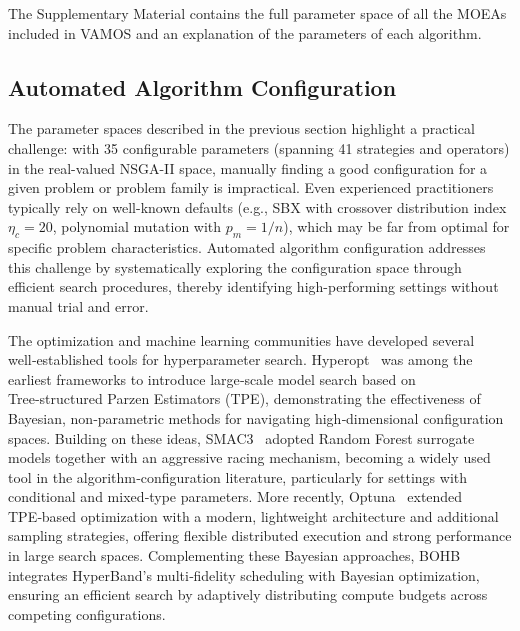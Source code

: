 \documentclass[journal]{IEEEtran}
\newcommand{\VAMOS}{VAMOS}
\begin{document}
The Supplementary Material contains the full parameter space of all the MOEAs included in \VAMOS{} and an explanation of the parameters of each algorithm.

\subsection{Automated Algorithm Configuration}
\label{sec:aac}

The parameter spaces described in the previous section highlight a practical challenge: with 35 configurable parameters (spanning 41 strategies and operators) in the real-valued NSGA-II space, manually finding a good configuration for a given problem or problem family is impractical. Even experienced practitioners typically rely on well-known defaults (e.g., SBX with crossover distribution index $\eta_c = 20$, polynomial mutation with $p_m = 1/n$), which may be far from optimal for specific problem characteristics. Automated algorithm configuration addresses this challenge by systematically exploring the configuration space through efficient search procedures, thereby identifying high-performing settings without manual trial and error.


The optimization and machine learning communities have developed several well‑established tools for hyperparameter search. Hyperopt~\cite{bergstra2013making} was among the earliest frameworks to introduce large‑scale model search based on Tree‑structured Parzen Estimators (TPE), demonstrating the effectiveness of Bayesian, non‑parametric methods for navigating high‑dimensional configuration spaces. Building on these ideas, SMAC3~\cite{LEF+22} adopted Random Forest surrogate models together with an aggressive racing mechanism, becoming a widely used tool in the algorithm‑configuration literature, particularly for settings with conditional and mixed‑type parameters. More recently, Optuna~\cite{ASY+19} extended TPE‑based optimization with a modern, lightweight architecture and additional sampling strategies, offering flexible distributed execution and strong performance in large search spaces. Complementing these Bayesian approaches, BOHB~\cite{FKH18} integrates HyperBand’s multi‑fidelity scheduling with Bayesian optimization, ensuring an efficient search by adaptively distributing compute budgets across competing configurations.
\end{document}

